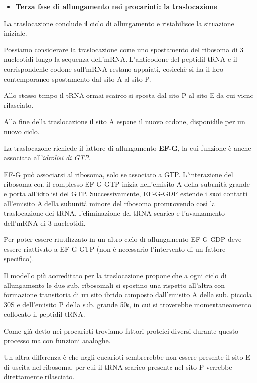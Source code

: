 \documentclass[11pt]{book}
\begin{document}
\begin{itemize}
\itemsep1pt\parskip0pt
\item
  \textbf{Terza fase di allungamento nei procarioti: la traslocazione}
\end{itemize}

La traslocazione conclude il ciclo di allungamento e ristabilisce la
situazione iniziale.

Possiamo considerare la traslocazione come uno spostamento del ribosoma
di 3 nucleotidi lungo la sequenza dell'mRNA. L'anticodone del
peptidil-tRNA e il corrispondente codone sull'mRNA restano appaiati,
cosicchè si ha il loro contemporaneo spostamento dal sito A al sito P.

Allo stesso tempo il tRNA ormai scairco si sposta dal sito P al sito E
da cui viene rilasciato.

Alla fine della traslocazione il sito A espone il nuovo codone,
disponidile per un nuovo ciclo.

La traslocazone richiede il fattore di allungamento \textbf{EF-G}, la
cui funzione è anche associata all'\emph{idrolisi di GTP}.

EF-G può associarsi al ribosoma, solo se associato a GTP. L'interazione
del ribosoma con il complesso EF-G-GTP inizia nell'emisito A della
subunità grande e porta all'idrolisi del GTP. Successivamente, EF-G-GDP
estende i suoi contatti all'emisito A della subunità minore del ribosoma
promuovendo così la traslocazione dei tRNA, l'eliminazione del tRNA
scarico e l'avanzamento dell'mRNA di 3 nucleotidi.

Per poter essere riutilizzato in un altro ciclo di allungamento EF-G-GDP
deve essere riattivato a EF-G-GTP (non è necessario l'intervento di un
fattore specifico).

Il modello più accreditato per la traslocazione propone che a ogni ciclo
di allungamento le due sub. ribosomali si spostino una rispetto
all'altra con formazione transitoria di un sito ibrido composto
dall'emisito A della sub. piccola 30S e dell'emisito P della sub. grande
50s, in cui si troverebbe momentaneamento collocato il peptidil-tRNA.

Come già detto nei procarioti troviamo fattori proteici diversi durante
questo processo ma con funzioni analoghe.

Un altra differenza è che negli eucarioti sembrerebbe non essere
presente il sito E di uscita nel ribosoma, per cui il tRNA scarico
presente nel sito P verrebbe direttamente rilasciato.
\end{document}
